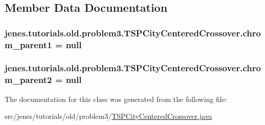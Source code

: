\subsection{Member Data Documentation}
\hypertarget{classjenes_1_1tutorials_1_1old_1_1problem3_1_1_t_s_p_city_centered_crossover_a6db3f90dcd7168296f0bf2e302f23b01}{
\subsubsection[{chrom\-\_\-parent1}]{ jenes.\-tutorials.\-old.\-problem3.\-T\-S\-P\-City\-Centered\-Crossover.\-chrom\-\_\-parent1 = null\hspace{0.3cm}{\ttfamily [private]}}}\label{classjenes_1_1tutorials_1_1old_1_1problem3_1_1_t_s_p_city_centered_crossover_a6db3f90dcd7168296f0bf2e302f23b01}
\hypertarget{classjenes_1_1tutorials_1_1old_1_1problem3_1_1_t_s_p_city_centered_crossover_ac6a6ab508405250bfacf8691052237e7}{
\subsubsection[{chrom\-\_\-parent2}]{ jenes.\-tutorials.\-old.\-problem3.\-T\-S\-P\-City\-Centered\-Crossover.\-chrom\-\_\-parent2 = null\hspace{0.3cm}{\ttfamily [private]}}}\label{classjenes_1_1tutorials_1_1old_1_1problem3_1_1_t_s_p_city_centered_crossover_ac6a6ab508405250bfacf8691052237e7}


The documentation for this class was generated from the following file\-:\begin{DoxyCompactItemize}
\item 
src/jenes/tutorials/old/problem3/\hyperlink{old_2problem3_2_t_s_p_city_centered_crossover_8java}{T\-S\-P\-City\-Centered\-Crossover.\-java}\end{DoxyCompactItemize}
